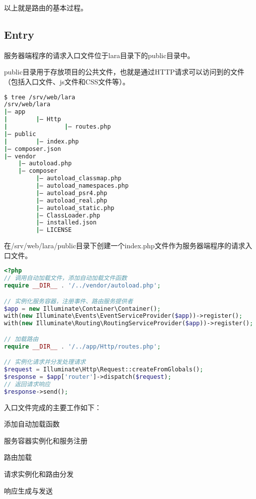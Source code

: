 以上就是路由的基本过程。

\subsection{Entry}

服务器端程序的请求入口文件位于lara目录下的public目录中。

public目录用于存放项目的公共文件，也就是通过HTTP请求可以访问到的文件（包括入口文件、js文件和CSS文件等）。

\begin{lstlisting}[language=bash]
$ tree /srv/web/lara
/srv/web/lara
|— app
|        |— Http
|                |— routes.php
|— public
|        |— index.php
|— composer.json
|— vendor
    |— autoload.php
    |— composer
         |— autoload_classmap.php
         |— autoload_namespaces.php
         |— autoload_psr4.php
         |— autoload_real.php
         |— autoload_static.php
         |— ClassLoader.php
         |— installed.json
         |— LICENSE
\end{lstlisting}

在/srv/web/lara/public目录下创建一个index.php文件作为服务器端程序的请求入口文件。


\begin{lstlisting}[language=PHP]
<?php
// 调用自动加载文件，添加自动加载文件函数
require __DIR__ . '/../vendor/autoload.php';

// 实例化服务容器，注册事件、路由服务提供者
$app = new Illuminate\Container\Container();
with(new Illuminate\Events\EventServiceProvider($app))->register();
with(new Illuminate\Routing\RoutingServiceProvider($app))->register();

// 加载路由
require __DIR__ . '/../app/Http/routes.php';

// 实例化请求并分发处理请求
$request = Illuminate\Http\Request::createFromGlobals();
$response = $app['router']->dispatch($request);
// 返回请求响应
$response->send();
\end{lstlisting}

入口文件完成的主要工作如下：

\begin{compactitem}
\item 添加自动加载函数
\item 服务容器实例化和服务注册
\item 路由加载
\item 请求实例化和路由分发
\item 响应生成与发送
\end{compactitem}


